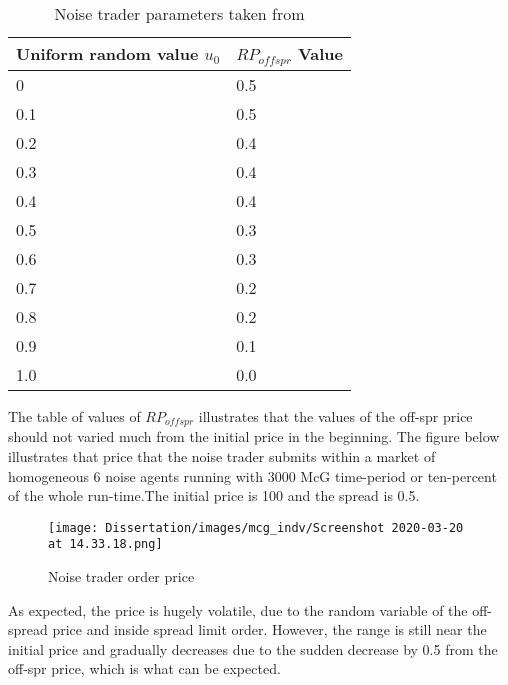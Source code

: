 \begin{table}[h]
\centering
\begin{tabular}{ |m||p{4cm}|} 
\hline
\textbf{Uniform random value $u_0$}& \textbf{$RP_{offspr}$ Value} \\
\hline
\hline
0 & 0.5\\
\hline 
0.1 & 0.5\\
\hline 
0.2 & 0.4\\
\hline 
0.3 & 0.4\\
\hline 
0.4 & 0.4\\
\hline 
0.5 & 0.3\\
\hline 
0.6 & 0.3\\
\hline 
0.7 & 0.2\\
\hline 
0.8 & 0.2\\
\hline 
0.9 & 0.1\\
\hline 
1.0 & 0.0\\
\hline
\end{tabular}
\caption{Noise trader parameters taken from \cite{McGroarty}}
\end{table}
\FloatBarrier 

The table of values of $RP_{offspr}$ illustrates that the values of the off-spr price should not varied much from the initial price in the beginning. The figure below illustrates that price that the noise trader submits within a market of homogeneous 6 noise agents running with 3000 McG time-period or ten-percent of the whole run-time.The initial price is 100 and the spread is 0.5. 

\begin{figure}[!htbp]
\texttt{[image: Dissertation/images/mcg\_indv/Screenshot 2020-03-20 at 14.33.18.png]}
\caption{Noise trader order price} 
\end{figure} 
\FloatBarrier

 
As expected, the price is hugely volatile, due to the random variable of the off-spread price and inside spread limit order. However, the range is still near the initial price and gradually decreases due to the sudden decrease by 0.5 from the off-spr price, which is what can be expected. 


